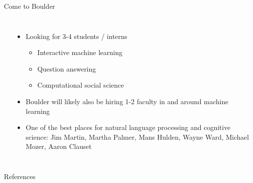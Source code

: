 \documentclass[compress]{beamer}
\begin{document}
\begin{frame}{Come to Boulder}
\begin{columns}
{           }
		\begin{itemize}
			\item Looking for 3-4 students / interns
			\begin{itemize}
				\item Interactive machine learning
				\item Question answering
				\item Computational social science
			\end{itemize}
			\item Boulder will likely also be hiring 1-2
                          faculty in and around machine learning
                        \item<2> One of the best places for natural
                          language processing and cognitive science: Jim Martin, Martha
                          Palmer, Mans Hulden, Wayne Ward, Michael
                          Mozer, Aaron Clauset
		\end{itemize}
\end{columns}

\end{frame}







\begin{frame}{References}

\tiny

\end{frame}
\end{document}
